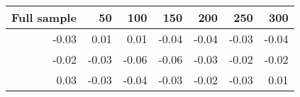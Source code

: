 
\begin{tabular}[t]{rrrrrrr}
\toprule
Full sample & 50 & 100 & 150 & 200 & 250 & 300\\
\midrule
-0.03 & 0.01 & 0.01 & -0.04 & -0.04 & -0.03 & -0.04\\
-0.02 & -0.03 & -0.06 & -0.06 & -0.03 & -0.02 & -0.02\\
0.03 & -0.03 & -0.04 & -0.03 & -0.02 & -0.03 & 0.01\\
\bottomrule
\end{tabular}

